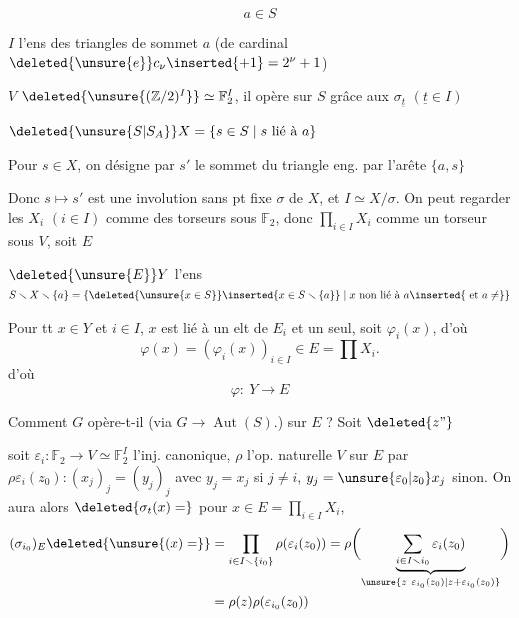 \[a\in S\]

$I$ l'ens des triangles de sommet $a$ (de cardinal $\deleted{\unsure{e}}c_\nu\inserted{+1}=2^\nu+1$)

$V$  $\deleted{\unsure{(\mathbb Z/2)^I}}\simeq\mathbb F_2^I$, il opère sur $S$ grâce aux $\sigma_{\underline t}$ $(\underline t\in I)$

$\deleted{\unsure{S|S_A}}X=\{s\in S\mid s\ \text{lié à }a\}$

 Pour $s\in X$, on désigne par $s'$ le  sommet du triangle eng. par l'arête $\{a,s\}$

Donc $s\mapsto s'$ est une involution sans pt fixe $\sigma$ de $X$, et $I\simeq X/\sigma$. On peut regarder les $X_i$ $(i\in I)$  comme des torseurs sous $\mathbb F_2$, donc $\prod_{i\in I}X_i$ comme un torseur sous $V$, soit $E$

 $\deleted{\unsure{E}}Y$ l'ens $S\smallsetminus X\smallsetminus\{a\}=\{\deleted{\unsure{x\in S}}\inserted{x\in S\smallsetminus\{a\}}\mid x\ \text{non lié à }a\inserted{\text{ et }a\ne}\}$

Pour tt $x\in Y$ et $i\in I$, $x$ est lié à un elt de $E_i$ et un seul, soit $\varphi_i(x)$, d'où
\[
\varphi(x)=(\varphi_i(x))_{i\in I}\in E=\prod X_i.
\]
d'où 
\[
\varphi:\ Y\longrightarrow E
\]

Comment $G$ opère-t-il (via $G\to\operatorname{Aut}(S)$.) sur $E$ ? Soit $\deleted{z\text{''}}$    

soit $\varepsilon_i:\mathbb F_2\longrightarrow V\simeq\mathbb F_2^I$  l'inj. canonique, $\rho$ l'op. naturelle  $V$ sur $E$ par $\rho\varepsilon_i(z_0):(x_j)_j=(y_j)_j$ avec $y_j=x_j$ si $j\ne i$, $y_j=\unsure{\varepsilon_0|z_0}x_j$ sinon. On aura alors $\deleted{\sigma_t(x)=}$
pour $x\in E=\prod_{i\in I} X_i$, 
\[
\begin{aligned}
(\sigma_{i_0})_E\deleted{\unsure{(x)=}}&=\prod_{i\in I\smallsetminus\{i_0\}}\rho(\varepsilon_i(z_0))
=\rho\biggl(\underbrace{\sum_{i\in I\smallsetminus i_0}\varepsilon_i(z_0)}_{\unsure{z\ \varepsilon_{i_0}(z_0)|z+\varepsilon_{i_0}(z_0)}}\biggr)\\
&=\rho(z)\rho(\varepsilon_{i_0}(z_0))
\end{aligned}
\]

